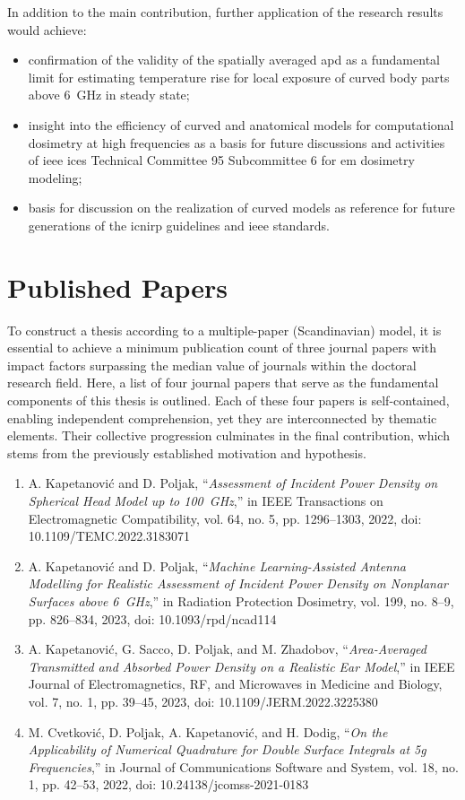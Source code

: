 In addition to the main contribution, further application of the research results would achieve:
\begin{itemize}
    \item confirmation of the validity of the spatially averaged \gls{apd} as a fundamental limit for estimating temperature rise for local exposure of curved body parts above \SI{6}{\GHz} in steady state;
    \item insight into the efficiency of curved and anatomical models for computational dosimetry at high frequencies as a basis for future discussions and activities of \gls{ieee} \gls{ices} Technical Committee 95 Subcommittee 6 for \gls{em} dosimetry modeling;
    \item basis for discussion on the realization of curved models as reference for future generations of the \gls{icnirp} guidelines and \gls{ieee} standards.
\end{itemize}

\section{Published Papers}
\label{sec:published_papers}
To construct a thesis according to a multiple-paper (Scandinavian) model, it is essential to achieve a minimum publication count of three journal papers with impact factors surpassing the median value of journals within the doctoral research field.
Here, a list of four journal papers that serve as the fundamental components of this thesis is outlined.
Each of these four papers is self-contained, enabling independent comprehension, yet they are interconnected by thematic elements.
Their collective progression culminates in the final contribution, which stems from the previously established motivation and hypothesis.

\begin{enumerate}
    \item A. Kapetanović and D. Poljak, ``\textit{Assessment of Incident Power Density on Spherical Head Model up to \SI{100}{\GHz}},'' in IEEE Transactions on Electromagnetic Compatibility, vol. 64, no. 5, pp. 1296--1303, 2022, doi: 10.1109/TEMC.2022.3183071
    \item A. Kapetanović and D. Poljak, ``\textit{Machine Learning-Assisted Antenna Modelling for Realistic Assessment of Incident Power Density on Nonplanar Surfaces above \SI{6}{\GHz}},'' in Radiation Protection Dosimetry, vol. 199, no. 8--9, pp. 826--834, 2023, doi: 10.1093/rpd/ncad114
    \item A. Kapetanović, G. Sacco, D. Poljak, and M. Zhadobov, ``\textit{Area-Averaged Transmitted and Absorbed Power Density on a Realistic Ear Model},'' in IEEE Journal of Electromagnetics, RF, and Microwaves in Medicine and Biology, vol. 7, no. 1, pp. 39--45, 2023, doi: 10.1109/JERM.2022.3225380
    \item M. Cvetković, D. Poljak, A. Kapetanović, and H. Dodig, ``\textit{On the Applicability of Numerical Quadrature for Double Surface Integrals at \gls{5g} Frequencies},'' in Journal of Communications Software and System, vol. 18, no. 1, pp. 42--53, 2022, doi: 10.24138/jcomss-2021-0183
\end{enumerate}

